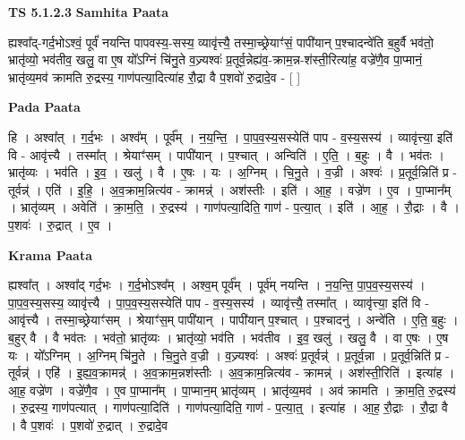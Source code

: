 \documentclass[17pt]{extarticle}
\begin{document}
\textbf{TS 5.1.2.3 } \newline
\textbf{Samhita Paata} \newline

ह्यश्वा᳚द्-गर्द॒भोऽश्वं॒ पूर्वं॑ नयन्ति पापवस्य॒-सस्य॒ व्यावृ॑त्त्यै॒ तस्मा॒च्छ्रेयाꣳ॑सं॒ पापी॑यान् प॒श्चादन्वे॑ति ब॒हुर्वै भव॑तो॒ भ्रातृ॑व्यो॒ भव॑तीव॒ खलु॒ वा ए॒ष यो᳚ऽग्निं चि॑नु॒ते व॒ज्र्यश्वः॑ प्र॒तूर्व॒न्नेह्य॑व॒-क्राम॒न्न-श॑स्ती॒रित्या॑ह॒ वज्रे॑णै॒व पा॒प्मानं॒ भ्रातृ॑व्य॒मव॑ क्रामति रु॒द्रस्य॒ गाण॑पत्या॒दित्या॑ह रौ॒द्रा वै प॒शवो॑ रु॒द्रादे॒व - [  ] \newline

\textbf{Pada Paata} \newline

हि । अश्वा᳚त् । ग॒र्द॒भः । अश्व᳚म् । पूर्व᳚म् । न॒य॒न्ति॒ । पा॒प॒व॒स्य॒सस्येति॑ पाप - व॒स्य॒सस्य॑ । व्यावृ॑त्त्या॒ इति॑ वि - आवृ॑त्त्यै । तस्मा᳚त् । श्रेयाꣳ॑सम् । पापी॑यान् । प॒श्चात् । अन्विति॑ । ए॒ति॒ । ब॒हुः । वै । भव॑तः । भ्रातृ॑व्यः । भव॑ति । इ॒व॒ । खलु॑ । वै । ए॒षः । यः । अ॒ग्निम् । चि॒नु॒ते । व॒ज्री । अश्वः॑ । प्र॒तूर्व॒न्निति॑ प्र - तूर्वन्न्॑ । एति॑ । इ॒हि॒ । अ॒व॒क्राम॒न्नित्य॑व - क्रामन्न्॑ । अश॑स्तीः । इति॑ । आ॒ह॒ । वज्रे॑ण । ए॒व । पा॒प्मान᳚म् । भ्रातृ॑व्यम् । अवेति॑ । क्रा॒म॒ति॒ । रु॒द्रस्य॑ । गाण॑पत्या॒दिति॒ गाण॑ - प॒त्या॒त् । इति॑ । आ॒ह॒ । रौ॒द्राः । वै । प॒शवः॑ । रु॒द्रात् । ए॒व ।  \newline


\textbf{Krama Paata} \newline

ह्यश्वा᳚त् । अश्वा᳚द् गर्द॒भः । ग॒र्द॒भोऽश्व᳚म् । अश्व॒म् पूर्व᳚म् । पूर्व॑म् नयन्ति । न॒य॒न्ति॒ पा॒प॒व॒स्य॒सस्य॑ । पा॒प॒व॒स्य॒सस्य॒ व्यावृ॑त्त्यै । पा॒प॒व॒स्य॒सस्येति॑ पाप - व॒स्य॒सस्य॑ । व्यावृ॑त्त्यै॒ तस्मा᳚त् । व्यावृ॑त्त्या॒ इति॑ वि - आवृ॑त्त्यै । तस्मा॒च्छ्रेयाꣳ॑सम् । श्रेयाꣳ॑स॒म् पापी॑यान् । पापी॑यान् प॒श्चात् । प॒श्चादनु॑ । अन्वे॑ति । ए॒ति॒ ब॒हुः । ब॒हुर् वै । वै भव॑तः । भव॑तो॒ भ्रातृ॑व्यः । भ्रातृ॑व्यो॒ भव॑ति । भव॑तीव । इ॒व॒ खलु॑ । खलु॒ वै । वा ए॒षः । ए॒ष यः । यो᳚ऽग्निम् । अ॒ग्निम् चि॑नु॒ते । चि॒नु॒ते व॒ज्री । व॒ज्र्यश्वः॑ । अश्वः॑ प्र॒तूर्वन्न्॑ । प्र॒तूर्व॒न्ना । प्र॒तूर्व॒न्निति॑ प्र - तूर्वन्न्॑ । एहि॑ । इ॒ह्य॒व॒क्रामन्न्॑ । अ॒व॒क्राम॒न्नश॑स्तीः । अ॒व॒क्राम॒न्नित्य॑व - क्रामन्न्॑ । अश॑स्ती॒रिति॑ । इत्या॑ह । आ॒ह॒ वज्रे॑ण । वज्रे॑णै॒व । ए॒व पा॒प्मान᳚म् । पा॒प्मान॒म् भ्रातृ॑व्यम् । भ्रातृ॑व्य॒मव॑ । अव॑ क्रामति । क्रा॒म॒ति॒ रु॒द्रस्य॑ । रु॒द्रस्य॒ गाण॑पत्यात् । गाण॑पत्या॒दिति॑ । गाण॑पत्या॒दिति॒ गाण॑ - प॒त्या॒त्॒ । इत्या॑ह । आ॒ह॒ रौ॒द्राः । रौ॒द्रा वै । वै प॒शवः॑ । प॒शवो॑ रु॒द्रात् । रु॒द्रादे॒व \newline
\end{document}
